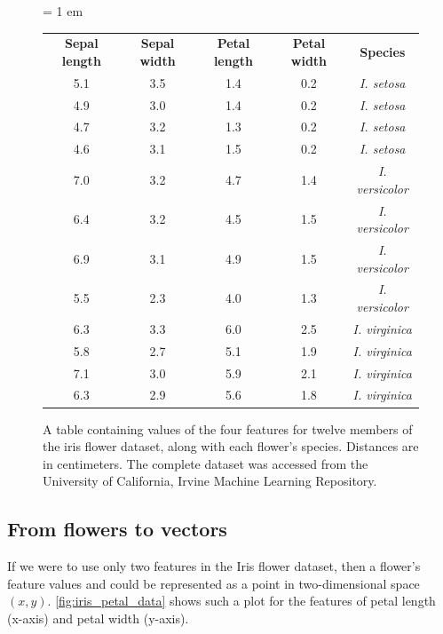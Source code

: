 \begin{figure}[h]
\centering
\tabcolsep = 1 em
\mySfFamily
\begin{tabular}{c c c c c}
\textbf{Sepal length} & \textbf{Sepal width} & \textbf{Petal length} & \textbf{Petal width} & \textbf{Species} \\
5.1 & 3.5 & 1.4 & 0.2 & \textit{I. setosa} \\
4.9 & 3.0 & 1.4 & 0.2 & \textit{I. setosa} \\
4.7 & 3.2 & 1.3 & 0.2 & \textit{I. setosa} \\
4.6 & 3.1 & 1.5 & 0.2 & \textit{I. setosa} \\
7.0 & 3.2 & 4.7 & 1.4 & \textit{I. versicolor} \\
6.4 & 3.2 & 4.5 & 1.5 & \textit{I. versicolor} \\
6.9 & 3.1 & 4.9 & 1.5 & \textit{I. versicolor} \\
5.5 & 2.3 & 4.0 & 1.3 & \textit{I. versicolor} \\
6.3 & 3.3 & 6.0 & 2.5 & \textit{I. virginica} \\
5.8 & 2.7 & 5.1 & 1.9 & \textit{I. virginica} \\
7.1 & 3.0 & 5.9 & 2.1 & \textit{I. virginica} \\
6.3 & 2.9 & 5.6 & 1.8 & \textit{I. virginica} \\
\end{tabular}
\caption{A table containing values of the four features for twelve members of the iris flower dataset, along with each flower's species. Distances are in centimeters. The complete dataset was accessed from the University of California, Irvine Machine Learning Repository.}
\label{fig:iris_feature_table}
\end{figure}

\begin{qbox}\end{qbox}

\FloatBarrier
{}
\subsection{From flowers to vectors}

If we were to use only two features in the Iris flower dataset, then a flower's feature values  and  could be represented as a point in two-dimensional space $(x, y)$. \autoref{fig:iris_petal_data} shows such a plot for the features of petal length (x-axis) and petal width (y-axis).

